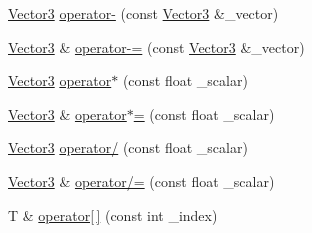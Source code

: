 \begin{DoxyCompactItemize}
\item 
\mbox{\hyperlink{structpad_1_1math_1_1_vector3}{Vector3}} \mbox{\hyperlink{structpad_1_1math_1_1_vector3_acce2697e7151ebb1c15840eb36535e12}{operator-\/}} (const \mbox{\hyperlink{structpad_1_1math_1_1_vector3}{Vector3}} \&\+\_\+vector)
\item 
\mbox{\hyperlink{structpad_1_1math_1_1_vector3}{Vector3}} \& \mbox{\hyperlink{structpad_1_1math_1_1_vector3_abc2512b1a4d062e231d32c6de4a19d3e}{operator-\/=}} (const \mbox{\hyperlink{structpad_1_1math_1_1_vector3}{Vector3}} \&\+\_\+vector)
\item 
\mbox{\hyperlink{structpad_1_1math_1_1_vector3}{Vector3}} \mbox{\hyperlink{structpad_1_1math_1_1_vector3_a25eb8201c257d3e10e280bb998892575}{operator$\ast$}} (const float \+\_\+scalar)
\item 
\mbox{\hyperlink{structpad_1_1math_1_1_vector3}{Vector3}} \& \mbox{\hyperlink{structpad_1_1math_1_1_vector3_acfa17a2711cc9cc1bec80bf9a5b1c1ba}{operator$\ast$=}} (const float \+\_\+scalar)
\item 
\mbox{\hyperlink{structpad_1_1math_1_1_vector3}{Vector3}} \mbox{\hyperlink{structpad_1_1math_1_1_vector3_a6da03717416e8f24f15c69a195e89734}{operator/}} (const float \+\_\+scalar)
\item 
\mbox{\hyperlink{structpad_1_1math_1_1_vector3}{Vector3}} \& \mbox{\hyperlink{structpad_1_1math_1_1_vector3_a562f20bc51eb5d598acecf4233bb8005}{operator/=}} (const float \+\_\+scalar)
\item 
T \& \mbox{\hyperlink{structpad_1_1math_1_1_vector3_af14bcf2fb21a1a991ba711cc00ba1307}{operator\mbox{[}$\,$\mbox{]}}} (const int \+\_\+index)
\end{DoxyCompactItemize}
